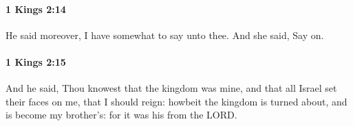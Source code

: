 		\paragraph{1 Kings 2:14} %
			\label{1KINGS-2-14}

			He said moreover, I have somewhat to say unto thee. And she said, Say on.


		\paragraph{1 Kings 2:15} %
			\label{1KINGS-2-15}

			And he said, Thou knowest that the kingdom was mine, and that all Israel set their faces on me, that I should reign: howbeit the kingdom is turned about, and is become my brother’s: for it was his from the LORD.


